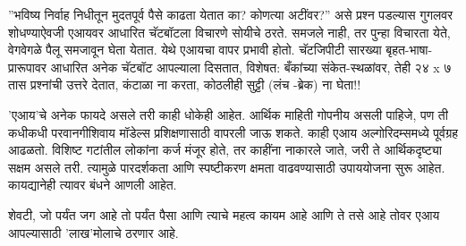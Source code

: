 ''भविष्य निर्वाह निधीतून मुदतपूर्व पैसे काढता येतात का? कोणत्या अटींवर?'' असे प्रश्न पडल्यास गुगलवर शोधण्याऐवजी एआयवर आधारित चॅटबॉटला विचारणे सोयीचे ठरते. समजले नाही, तर पुन्हा विचारता येते, वेगवेगळे पैलू समजावून घेता येतात. येथे एआयचा वापर प्रभावी होतो. चॅटजिपीटी सारख्या बृहत-भाषा-प्रारूपावर आधारित अनेक चॅटबॉट आपल्याला दिसतात, विशेषत: बँकांच्या संकेत-स्थळांवर, तेही २४ x ७ तास प्रश्नांची उत्तरे देतात, कंटाळा ना करता, कोठलीही सुट्टी (लंच -ब्रेक) ना घेता!!

'एआय'चे अनेक फायदे असले तरी काही धोकेही आहेत. आर्थिक माहिती गोपनीय असली पाहिजे, पण ती कधीकधी परवानगीशिवाय मॉडेल्स प्रशिक्षणासाठी वापरली जाऊ शकते. काही एआय अल्गोरिदम्समध्ये पूर्वग्रह आढळतो. विशिष्ट गटांतील लोकांना कर्ज मंजूर होते, तर काहींना नाकारले जाते, जरी ते आर्थिकदृष्ट्या सक्षम असले तरी. त्यामुळे पारदर्शकता आणि स्पष्टीकरण क्षमता वाढवण्यासाठी उपाययोजना सुरू आहेत. कायद्यानेही त्यावर बंधने आणली आहेत.

शेवटी, जो पर्यंत जग आहे तो पर्यंत पैसा आणि त्याचे महत्व कायम आहे आणि ते तसे आहे तोवर एआय आपल्यासाठी 'लाख'मोलाचे ठरणार आहे.